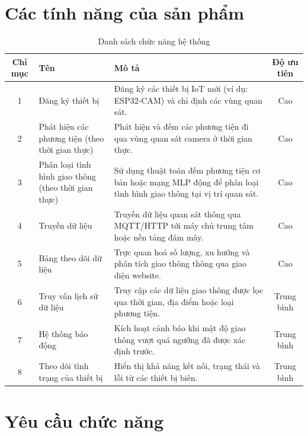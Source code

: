 \section{Các tính năng của sản phẩm}
\label{sec:product_features}
\begin{table}[H]
    \centering
    \caption{Danh sách chức năng hệ thống}
    \renewcommand{\arraystretch}{1.4} %
    \begin{tabular}{|c|p{4cm}|p{8cm}|c|}
    \hline
    \textbf{Chỉ mục} & \textbf{Tên} & \textbf{Mô tả} & \textbf{Độ ưu tiên} \\ \hline
    1 & Đăng ký thiết bị & Đăng ký các thiết bị IoT mới (ví dụ: ESP32-CAM) và chỉ định các vùng quan sát. & Cao \\ \hline
    2 & Phát hiện các phương tiện (theo thời gian thực) & Phát hiện và đếm các phương tiện đi qua vùng quan sát camera ở thời gian thực. & Cao \\ \hline
    3 & Phân loại tình hình giao thông (theo thời gian thực) & Sử dụng thuật toán đếm phương tiện cơ bản hoặc mạng MLP động để phân loại tình hình giao thông tại vị trí quan sát. & Cao \\ \hline
    4 & Truyền dữ liệu & Truyền dữ liệu quan sát thông qua MQTT/HTTP tới máy chủ trung tâm hoặc nền tảng đám mây. & Cao \\ \hline
    5 & Bảng theo dõi dữ liệu & Trực quan hoá số lượng, xu hướng và phân tích giao thông thông qua giao diện website. & Cao \\ \hline
    6 & Truy vấn lịch sử dữ liệu & Truy cập các dữ liệu giao thông được lọc qua thời gian, địa điểm hoặc loại phương tiện. & Trung bình \\ \hline
    7 & Hệ thống báo động & Kích hoạt cảnh báo khi mật độ giao thông vượt quá ngưỡng đã được xác định trước. & Trung bình \\ \hline
    8 & Theo dõi tình trạng của thiết bị & Hiển thị khả năng kết nối, trạng thái và lỗi từ các thiết bị biên. & Trung bình \\ \hline
    \end{tabular}
\end{table}
    
\section{Yêu cầu chức năng}
\label{feature_request}
